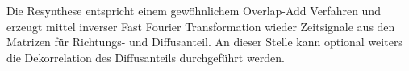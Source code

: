 Die Resynthese entspricht einem gewöhnlichem Overlap-Add Verfahren und erzeugt mittel inverser Fast Fourier Transformation wieder Zeitsignale aus den Matrizen für Richtungs- und Diffusanteil. An dieser Stelle kann optional weiters die Dekorrelation des Diffusanteils durchgeführt werden.
